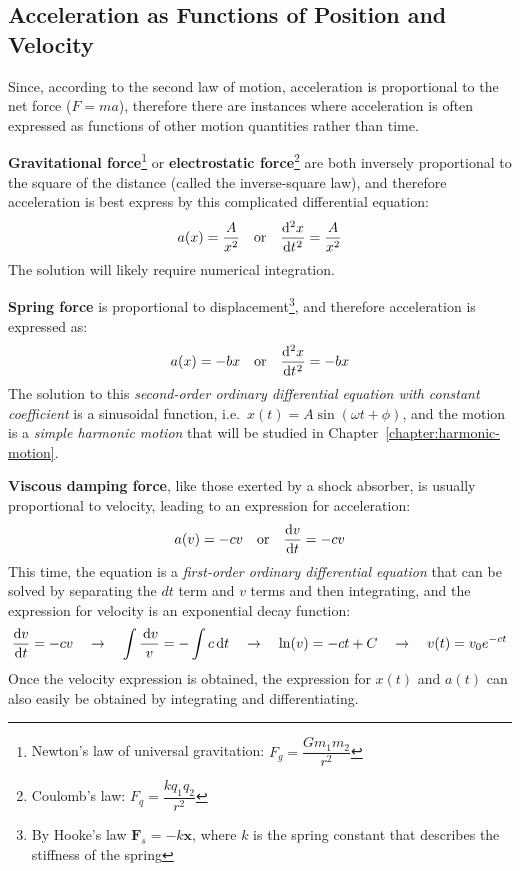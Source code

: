 \subsection{Acceleration as Functions of Position and Velocity}

Since, according to the second law of motion, acceleration is proportional to
the net force ($F=ma$), therefore there are instances where acceleration is
often expressed as functions of other motion quantities rather than time.

\textbf{Gravitational force}\footnote{Newton's law of universal
gravitation: $F_g=\dfrac{Gm_1m_2}{r^2}$} or \textbf{electrostatic
  force}\footnote{Coulomb's law: $F_q=\dfrac{kq_1q_2}{r^2}$} are both inversely
proportional to the square of the distance (called the inverse-square law), and
therefore acceleration is best express by this complicated differential
equation:
\begin{equation*}
  a(x)=\frac A{x^2} \quad\text{or}\quad \diff[2] xt=\frac A{x^2}
\end{equation*}
The solution will likely require numerical integration.

\textbf{Spring force} is proportional to displacement\footnote{By Hooke's law
$\bm F_s=-k\bm x$, where $k$ is the spring constant that describes the
stiffness of the spring}, and therefore acceleration is expressed as:
\begin{equation*}
  a(x)=-bx\quad\text{or}\quad \diff[2] xt=-bx
\end{equation*}
The solution to this \emph{second-order ordinary differential equation with
constant coefficient} is a sinusoidal function, i.e.\
$x(t)=A\sin(\omega t+\phi)$, and the motion is a \emph{simple harmonic
motion} that will be studied in Chapter~\ref{chapter:harmonic-motion}.

\textbf{Viscous damping force}, like those exerted by a shock absorber, is
usually proportional to velocity, leading to an expression for acceleration:
\begin{equation*}
  a(v)=-cv\quad\text{or}\quad \diff vt=-cv
\end{equation*}
This time, the equation is a \emph{first-order ordinary differential equation}
that can be solved by separating the $dt$ term and $v$ terms and then
integrating, and the expression for velocity is an exponential decay function:
\begin{equation*}
  \diff vt=-cv\quad\rightarrow\quad \int\frac{\dl v}{v}=-\int c\dl t
  \quad\rightarrow\quad \ln(v)=-ct+C
  \quad\rightarrow\quad v(t)=v_0e^{-ct}
\end{equation*}
Once the velocity expression is obtained, the expression for $x(t)$ and
$a(t)$ can also easily be obtained by integrating and differentiating.

